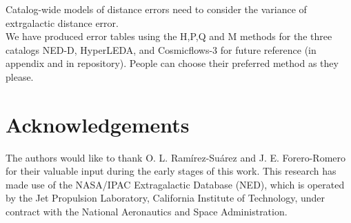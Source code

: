 \documentclass[a4paper,fleqn,usenatbib]{mnras}
\begin{document}
Catalog-wide models of distance errors need to consider the variance of extrgalactic distance error.\\

We have produced error tables using the H,P,Q and M methods for the three catalogs NED-D, HyperLEDA, and Cosmicflows-3 for future reference (in appendix and in repository). People can choose their preferred method as they please.


\section*{Acknowledgements}

The authors would like to thank O. L. Ram\'irez-Su\'arez and J. E. Forero-Romero for their valuable input during the early stages of this work. This research has made use of the NASA/IPAC Extragalactic Database (NED), which is operated by the Jet Propulsion Laboratory, California Institute of Technology, under contract with the National Aeronautics and Space Administration.










\appendix
\end{document}
